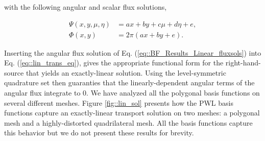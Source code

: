 \documentclass[11pt]{article}
\begin{document}
\noindent with the following angular and scalar flux solutions,

\begin{equation}
\label{eq::BF_Results_Linear_fluxsols}
\begin{aligned}
\Psi (x,y,\mu,\eta) &= ax + by + c \mu + d\eta + e,\\
\Phi (x,y) &= 2 \pi \left( ax + by  + e \right).
\end{aligned} 
\end{equation}

\noindent Inserting the angular flux solution of Eq. (\ref{eq::BF_Results_Linear_fluxsols}) into Eq. (\ref{eq::lin_trans_eq}), gives the appropriate functional form for the right-hand-source that yields an exactly-linear solution. Using the level-symmetric quadrature set then guaranties that the linearly-dependent angular terms of the angular flux integrate to 0. We have analyzed all the polygonal basis functions on several different meshes. Figure \ref{fig::lin_sol} presents how the PWL basis functions capture an exactly-linear transport solution on two meshes: a polygonal mesh and a highly-distorted quadrilateral mesh. All the basis functions capture this behavior but we do not present these results for brevity.
\end{document}
